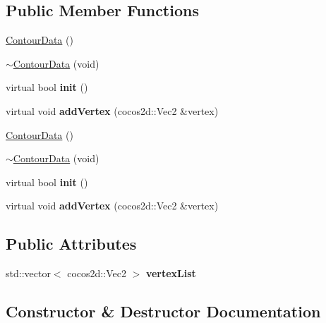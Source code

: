 \subsection*{Public Member Functions}
\begin{DoxyCompactItemize}
\item 
\hyperlink{classcocostudio_1_1ContourData_ac002aae699e8567d033b100b84a4a528}{Contour\+Data} ()
\item 
\hyperlink{classcocostudio_1_1ContourData_a8425314a8669b8aa0dca85bb67a81075}{$\sim$\+Contour\+Data} (void)
\item 
\mbox{\label{classcocostudio_1_1ContourData_ae5f96897170696ca6fdc6cc278f00da5}} 
virtual bool {\bfseries init} ()
\item 
\mbox{\label{classcocostudio_1_1ContourData_a04124fa3cb9a7ddf141064c1e902586a}} 
virtual void {\bfseries add\+Vertex} (cocos2d\+::\+Vec2 \&vertex)
\item 
\hyperlink{classcocostudio_1_1ContourData_ac002aae699e8567d033b100b84a4a528}{Contour\+Data} ()
\item 
\hyperlink{classcocostudio_1_1ContourData_a8425314a8669b8aa0dca85bb67a81075}{$\sim$\+Contour\+Data} (void)
\item 
\mbox{\label{classcocostudio_1_1ContourData_a6257b63a9514936dc2d1b546c52cd1d7}} 
virtual bool {\bfseries init} ()
\item 
\mbox{\label{classcocostudio_1_1ContourData_a04124fa3cb9a7ddf141064c1e902586a}} 
virtual void {\bfseries add\+Vertex} (cocos2d\+::\+Vec2 \&vertex)
\end{DoxyCompactItemize}
\subsection*{Public Attributes}
\begin{DoxyCompactItemize}
\item 
\mbox{\label{classcocostudio_1_1ContourData_ad59bb0896f2228c046d3c5543c32a3e1}} 
std\+::vector$<$ cocos2d\+::\+Vec2 $>$ {\bfseries vertex\+List}
\end{DoxyCompactItemize}


\subsection{Constructor \& Destructor Documentation}
\mbox{\label{classcocostudio_1_1ContourData_ac002aae699e8567d033b100b84a4a528}} 

